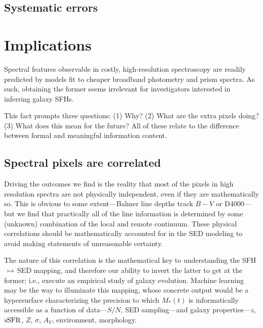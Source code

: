 \documentclass[a4paper,fleqn,usenatbib]{mnras}
\newcommand{\Mstel}{M_\ast}
\newcommand{\ssfr}{{\rm sSFR}}
\begin{document}
\subsection{Systematic errors}
\label{sec:systematics}



\section{Implications}
\label{sec:discussion}

Spectral features observable in costly, high-resolution spectroscopy are readily predicted by 
models fit to cheaper broadband photometry and prism spectra. As such, obtaining the former 
seems irrelevant for investigators interested in inferring galaxy SFHs.

This fact prompts three questions: (1) Why? (2) What are the extra pixels doing? (3) What does
this mean for the future? All of these relate to the difference between formal and meaningful 
information content.

\subsection{Spectral pixels are correlated}
\label{sec:pixels}

Driving the outcomes we find is the reality that most of the pixels in high resolution 
spectra are not physically independent, even if they are mathematically so. This is obvious to 
some extent---Balmer line depths track $B-V$ or D4000---but we find that practically all of the 
line information is determined by some (unknown) combination of the local and remote 
continuum. These physical correlations should be mathematically accounted for in the SED 
modeling to avoid making statements of unreasonable certainty.

The nature of this correlation is the mathematical key to understanding the SFH$\,\mapsto\,$SED 
mapping, and therefore our ability to invert the latter to get at the former; i.e., execute an empirical 
study of galaxy evolution. Machine learning may be the way to illuminate this mapping, whose concrete 
output would be a hypersurface characterizing the precision to which $\Mstel(t)$ is informatically 
accessible as a function of data---$S/N$, SED sampling---and galaxy properties---$z$, $\ssfr$, $Z$, 
$\sigma$, $A_{V}$, environment, morphology. 
\end{document}
